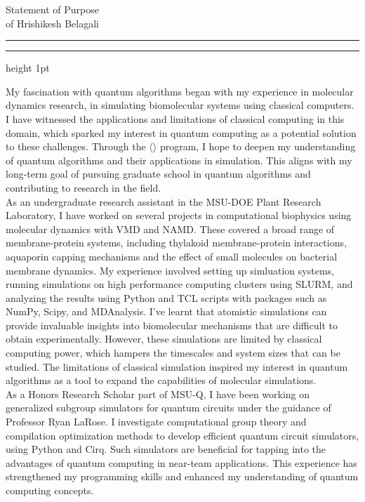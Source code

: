 \documentclass{article}
\newcommand{\soptitle}{Statement of Purpose}
\newcommand{\yourname}{Hrishikesh Belagali}
\begin{document}
\begin{center}\LARGE\soptitle\\
\large of \yourname\
\end{center}

\hrule
\vspace{1pt}
\hrule height 1pt

\bigskip
My fascination with quantum algorithms began with my experience in molecular dynamics 
research, in simulating biomolecular systems using classical computers. I have 
witnessed the applications and limitations of classical computing in this domain, 
which sparked my interest in quantum computing as a potential solution to these challenges. Through the 
$\langle \rangle$ program, I hope to deepen my understanding of quantum algorithms
and their applications in simulation. This aligns with my long-term goal of 
pursuing graduate school in quantum algorithms and contributing to research in the field. \\

As an undergraduate research assistant in the MSU-DOE Plant Research Laboratory, 
I have worked on several projects in computational biophysics using molecular dynamics with VMD and NAMD.
These covered a broad range of membrane-protein systems, including thylakoid membrane-protein interactions, aquaporin capping 
mechanisms and the effect of small molecules on bacterial membrane dynamics. My experience involved setting up simluation systems, 
running simulations on high performance computing clusters using SLURM, and analyzing the results using Python and TCL scripts 
with packages such as NumPy, Scipy, and MDAnalysis. I've learnt that atomistic simulations can provide invaluable insights into 
biomolecular mechanisms that are difficult to obtain experimentally. However, these simulations are limited by 
classical computing power, which hampers the timescales and system sizes that can be studied. The limitations of classical 
simulation inspired my interest in quantum algorithms as a tool to expand the capabilities of molecular simulations. \\

As a Honors Research Scholar part of MSU-Q, I have been working on generalized subgroup simulators for quantum circuits 
under the guidance of Professor Ryan LaRose. I investigate computational group theory and compilation optimization methods 
to develop efficient quantum circuit simulators, using Python and Cirq. Such simulators are beneficial for tapping into the 
advantages of quantum computing in near-team applications. This experience has strengthened my programming skills 
and enhanced my understanding of quantum computing concepts. \\
\end{document}
